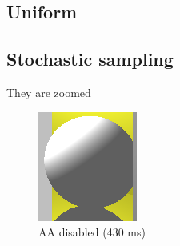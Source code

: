 \subsection{Uniform}

\subsection{Stochastic sampling}

They are zoomed
\begin{figure}[H]
    \centering
    \includegraphics[width=\linewidth]{img/antialiasing/no_aa.png}
    \caption{AA disabled (430 ms)}
\endminipage\hfill
{}
    \centering

\end{figure}
